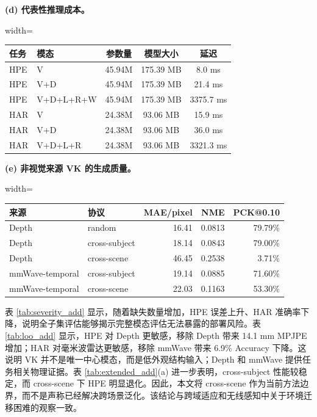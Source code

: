 \documentclass[journal]{IEEEtran}
\begin{document}
\begin{table}[!t]
\vspace{0.5em}
\begin{minipage}[t]{0.48\textwidth}
\centering
\textbf{(d) 代表性推理成本。}\par\smallskip
\begin{adjustbox}{width=\linewidth}
\begin{tabular}{llccc}
\toprule
任务 & 模态 & 参数量 & 模型大小 & 延迟 \\
\midrule
HPE & V & 45.94M & 175.39 MB & 8.0 ms \\
HPE & V+D & 45.94M & 175.39 MB & 21.4 ms \\
HPE & V+D+L+R+W & 45.94M & 175.39 MB & 3375.7 ms \\
HAR & V & 24.38M & 93.06 MB & 15.9 ms \\
HAR & V+D & 24.38M & 93.06 MB & 36.0 ms \\
HAR & V+D+L+R & 24.38M & 93.06 MB & 3321.3 ms \\
\bottomrule
\end{tabular}
\end{adjustbox}
\end{minipage}\hfill
\begin{minipage}[t]{0.48\textwidth}
\centering
\textbf{(e) 非视觉来源 VK 的生成质量。}\par\smallskip
\begin{adjustbox}{width=\linewidth}
\begin{tabular}{llrrr}
\toprule
来源 & 协议 & MAE/pixel & NME & PCK@0.10 \\
\midrule
Depth & random & 16.41 & 0.0813 & 79.79\% \\
Depth & cross-subject & 18.14 & 0.0843 & 79.00\% \\
Depth & cross-scene & 46.45 & 0.2538 & 3.71\% \\
mmWave-temporal & cross-subject & 19.14 & 0.0885 & 71.60\% \\
mmWave-temporal & cross-scene & 22.03 & 0.1163 & 53.30\% \\
\bottomrule
\end{tabular}
\end{adjustbox}
\end{minipage}
\end{table}

表 \ref{tab:severity_add} 显示，随着缺失数量增加，HPE 误差上升、HAR 准确率下降，说明全子集评估能够揭示完整模态评估无法暴露的部署风险。表 \ref{tab:loo_add} 显示，HPE 对 Depth 更敏感，移除 Depth 带来 14.1 mm MPJPE 增加；HAR 对毫米波雷达更敏感，移除 mmWave 带来 6.9\% Accuracy 下降。这说明 VK 并不是唯一中心模态，而是低外观结构输入；Depth 和 mmWave 提供任务相关物理证据。表 \ref{tab:extended_add}(a) 进一步表明，cross-subject 性能较稳定，而 cross-scene 下 HPE 明显退化。因此，本文将 cross-scene 作为当前方法边界，而不是声称已经解决跨场景泛化。该结论与跨域适应和无线感知中关于环境迁移困难的观察一致\cite{domainAdapt,adapose,robustwifi,rfpose,mmwaveHar}。
\end{document}
